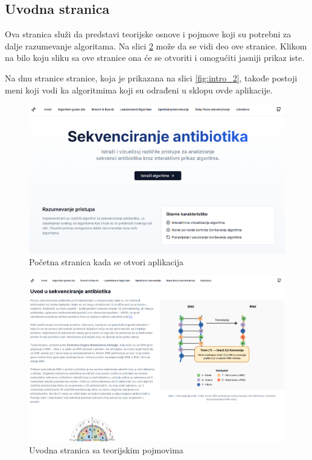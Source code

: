 \documentclass[12pt,oneside]{memoir}
\begin{document}
\subsection{Uvodna stranica}

Ova stranica služi da predstavi teorijske osnove i pojmove koji su potrebni za dalje razumevanje algoritama. Na slici \ref{fig:intro_1} može da se vidi deo ove stranice. Klikom na bilo koju sliku sa ove stranice ona će se otvoriti i omogućiti jasniji prikaz iste.

Na dnu stranice stranice, koja je prikazana na slici \ref{fig:intro_2}, takođe postoji meni koji vodi ka algoritmima koji su odrađeni u sklopu ovde aplikacije.

\begin{figure}[H]
\centering
\includegraphics[width=1\textwidth]{images/landing_page.png}
\caption{Početna stranica kada se otvori aplikacija}
\label{fig:landing_page}
\end{figure}

\begin{figure}[H]
\centering
\includegraphics[width=1\textwidth,height=0.4\textheight]{images/intro_1.png}
\caption{Uvodna stranica sa teorijskim pojmovima}
\label{fig:intro_1}
\end{figure}
\end{document}
